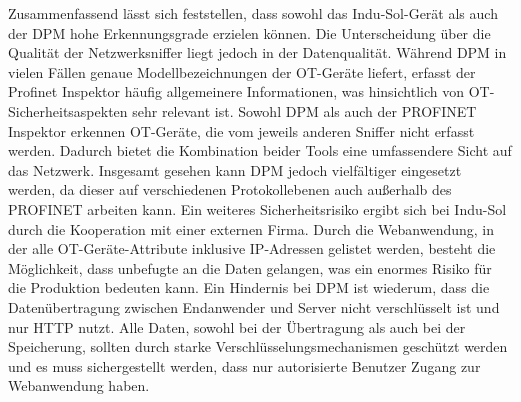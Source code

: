 \clearpage
\noindent Zusammenfassend lässt sich feststellen, dass sowohl das Indu-Sol-Gerät als auch der DPM hohe Erkennungsgrade erzielen können. Die Unterscheidung über die Qualität der Netzwerksniffer liegt jedoch in der Datenqualität. Während DPM in vielen Fällen genaue Modellbezeichnungen der OT-Geräte liefert, erfasst der Profinet Inspektor häufig allgemeinere Informationen, was hinsichtlich von OT-Sicherheitsaspekten sehr relevant ist. Sowohl DPM als auch der PROFINET Inspektor erkennen OT-Geräte, die vom jeweils anderen Sniffer nicht erfasst werden. Dadurch bietet die Kombination beider Tools eine umfassendere Sicht auf das Netzwerk. Insgesamt gesehen kann DPM jedoch vielfältiger eingesetzt werden, da dieser auf verschiedenen Protokollebenen auch außerhalb des PROFINET arbeiten kann. Ein weiteres Sicherheitsrisiko ergibt sich bei Indu-Sol durch die Kooperation mit einer externen Firma. Durch die Webanwendung, in der alle OT-Geräte-Attribute inklusive IP-Adressen gelistet werden, besteht die Möglichkeit, dass unbefugte an die Daten gelangen, was ein enormes Risiko für die Produktion bedeuten kann. Ein Hindernis bei DPM ist wiederum, dass die Datenübertragung zwischen Endanwender und Server nicht verschlüsselt ist und nur HTTP nutzt. Alle Daten, sowohl bei der Übertragung als auch bei der Speicherung, sollten durch starke Verschlüsselungsmechanismen geschützt werden und es muss sichergestellt werden, dass nur autorisierte Benutzer Zugang zur Webanwendung haben.






